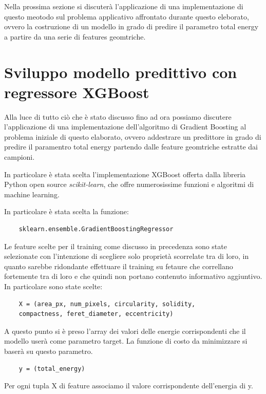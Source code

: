\documentclass[12pt,a4paper,openright,twoside]{report}
\begin{document}
Nella prossima sezione si discuterà l'applicazione di una implementazione di questo meotodo sul problema applicativo affrontato durante questo eleborato, ovvero la costruzione di un modello in grado di predire il parametro total energy a partire da una serie di features geomtriche. 


\section{Sviluppo modello predittivo con regressore XGBoost}
Alla luce di tutto ciò che è stato discusso fino ad ora possiamo discutere l'applicazione di una implementazione dell'algoritmo di Gradient Boosting al problema iniziale di questo elaborato, ovvero addestrare un predittore in grado di predire il paramentro total energy partendo dalle feature geomtriche estratte dai campioni. 

In particolare è stata scelta l'implementazione XGBoost offerta dalla libreria Python open source \emph{scikit-learn}, che offre numerosissime funzioni e algoritmi di machine learning.

In particolare è stata scelta la funzione: 
\begin{verbatim}
    sklearn.ensemble.GradientBoostingRegressor
\end{verbatim}

Le feature scelte per il training come discusso in precedenza sono state selezionate con l'intenzione di scegliere solo proprietà scorrelate tra di loro, in quanto sarebbe ridondante effettuare il training su fetaure che correllano fortemente tra di loro e che quindi non portano contenuto informativo aggiuntivo. 
In particolare sono state scelte: 
\begin{verbatim}
    X = (area_px, num_pixels, circularity, solidity,
    compactness, feret_diameter, eccentricity)
\end{verbatim}
A questo punto si è preso l’array dei valori delle energie corrispondenti che il modello userà come parametro target. La funzione di costo da minimizzare si baserà su questo parametro. 
\begin{verbatim}
    y = (total_energy)
\end{verbatim}
Per ogni tupla X di feature associamo il valore corrispondente dell'energia di y.
\end{document}
